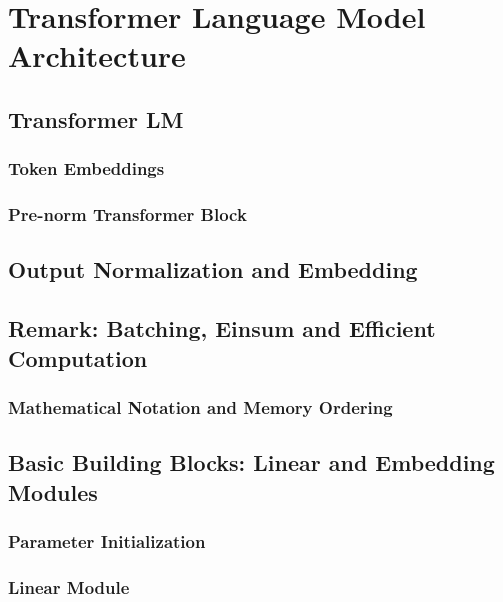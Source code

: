 \section{Transformer Language Model Architecture}

\subsection{Transformer LM}

\subsubsection{Token Embeddings}

\subsubsection{Pre-norm Transformer Block}

\subsection{Output Normalization and Embedding}

\subsection{Remark: Batching, Einsum and Eﬀicient Computation}

\subsubsection{Mathematical Notation and Memory Ordering}

\subsection{Basic Building Blocks: Linear and Embedding Modules}

\subsubsection{Parameter Initialization}

\subsubsection{Linear Module}

